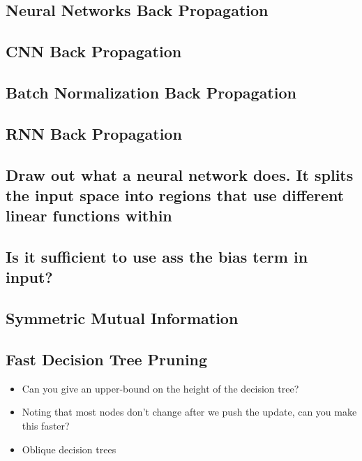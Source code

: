 \subsection{Neural Networks Back Propagation}
\subsection{CNN Back Propagation}
\subsection{Batch Normalization Back Propagation}
\subsection{RNN Back Propagation}
\subsection{Draw out what a neural network does. It splits the input space into regions that use different linear functions within}
\subsection{Is it sufficient to use ass the bias term in input?}
\subsection{Symmetric Mutual Information}
\subsection{Fast Decision Tree Pruning}
\begin{itemize}
\item Can you give an upper-bound on the height of the decision tree?
\item 
Noting that most nodes don't change after we push the update, can you make this faster?
\item Oblique decision trees
\end{itemize}
